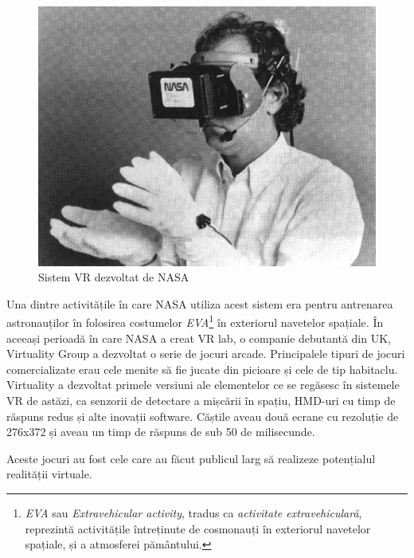 \begin{figure}[h]
  \centering
  \includegraphics[scale=0.8]{img/nasaVR.jpg}
  \caption{Sistem VR dezvoltat de NASA}
\end{figure}

Una dintre activitățile în care NASA utiliza acest sistem era pentru antrenarea astronauților în folosirea costumelor \textit{EVA}\footnote{\textit{EVA} sau \textit{Extravehicular activity}, tradus ca \textit{activitate extravehiculară}, reprezintă activitățile întreținute de cosmonauți în exteriorul navetelor spațiale, și a atmosferei pământului.} în exteriorul navetelor spațiale.
În aceeași perioadă în care NASA a creat VR lab, o companie debutantă din UK, Virtuality Group a dezvoltat o serie de jocuri arcade. Principalele tipuri de jocuri comercializate erau cele menite să fie jucate din picioare și cele de tip habitaclu. Virtuality a dezvoltat primele versiuni ale elementelor ce se regăsesc în sistemele VR de astăzi, ca senzorii de detectare a mișcării în spațiu, HMD-uri cu timp de răspuns redus și alte inovații software. Căștile aveau două ecrane cu rezoluție de 276x372 și aveau un timp de răspuns de sub 50 de milisecunde.

Aceste jocuri au fost cele care au făcut publicul larg să realizeze potențialul realității virtuale.

